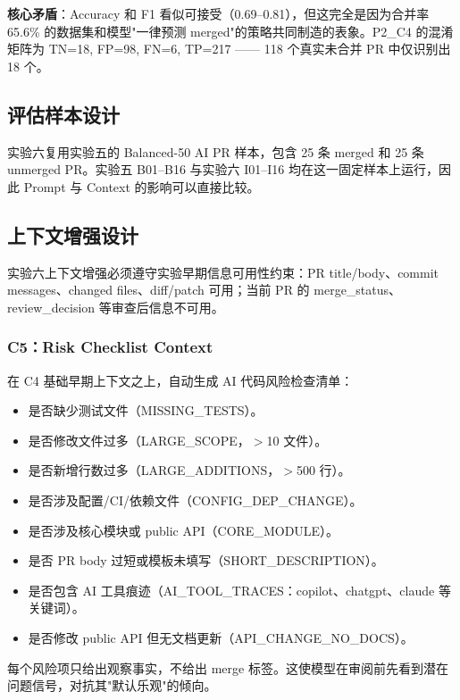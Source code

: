 \documentclass{experimentreport}
\begin{document}
\textbf{核心矛盾}：Accuracy 和 F1 看似可接受（0.69--0.81），但这完全是因为合并率 65.6\% 的数据集和模型"一律预测 merged"的策略共同制造的表象。P2\_C4 的混淆矩阵为 TN=18, FP=98, FN=6, TP=217 —— 118 个真实未合并 PR 中仅识别出 18 个。

\subsection{评估样本设计}

实验六复用实验五的 Balanced-50 AI PR 样本，包含 25 条 merged 和 25 条 unmerged PR。实验五 B01--B16 与实验六 I01--I16 均在这一固定样本上运行，因此 Prompt 与 Context 的影响可以直接比较。

\subsection{上下文增强设计}

实验六上下文增强必须遵守实验早期信息可用性约束：PR title/body、commit messages、changed files、diff/patch 可用；当前 PR 的 merge\_status、review\_decision 等审查后信息不可用。

\subsubsection{C5：Risk Checklist Context}

在 C4 基础早期上下文之上，自动生成 AI 代码风险检查清单：

\begin{itemize}
    \item 是否缺少测试文件（MISSING\_TESTS）。
    \item 是否修改文件过多（LARGE\_SCOPE，$>$10 文件）。
    \item 是否新增行数过多（LARGE\_ADDITIONS，$>$500 行）。
    \item 是否涉及配置/CI/依赖文件（CONFIG\_DEP\_CHANGE）。
    \item 是否涉及核心模块或 public API（CORE\_MODULE）。
    \item 是否 PR body 过短或模板未填写（SHORT\_DESCRIPTION）。
    \item 是否包含 AI 工具痕迹（AI\_TOOL\_TRACES：copilot、chatgpt、claude 等关键词）。
    \item 是否修改 public API 但无文档更新（API\_CHANGE\_NO\_DOCS）。
\end{itemize}

每个风险项只给出观察事实，不给出 merge 标签。这使模型在审阅前先看到潜在问题信号，对抗其"默认乐观"的倾向。
\end{document}
